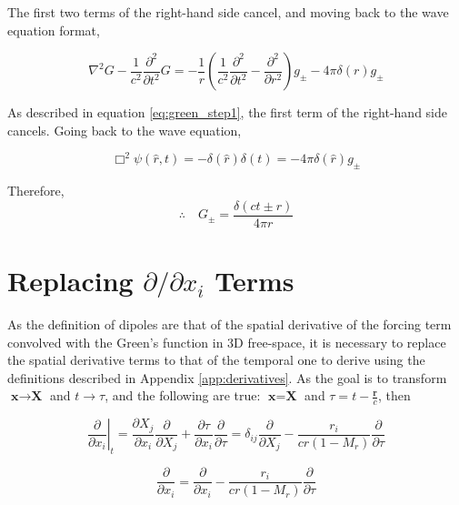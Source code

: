 The first two terms of the right-hand side cancel, and moving back to the wave equation format,

\begin{equation}
    \nabla^2G-\frac{1}{c^2}\frac{\partial^2}{\partial t^2}G = -\frac{1}{r} \left(\frac{1}{c^2}\frac{\partial^2}{\partial t^2} - \frac{\partial ^2}{\partial r^2}\right)g_{\pm} - 4\pi \delta(r)g_{\pm}
    \label{eq:green_step2}
\end{equation}

As described in equation \ref{eq:green_step1}, the first term of the right-hand side cancels. Going back to the wave equation,

\begin{equation*}
    \Box^2 \psi(\hat{r},t)=-\delta(\hat{r})\delta(t)=-4\pi \delta(\hat{r})g_{\pm}
\end{equation*}

Therefore, 
\begin{equation}
    \therefore \quad G_{\pm}=\frac{\delta(ct\pm r)}{4\pi r}
    \label{eq:greensfunction_derived}
\end{equation}

\chapter{Replacing \texorpdfstring{$\partial / \partial x_i$}/ Terms} \label{app:ddx_replace}

As the definition of dipoles are that of the spatial derivative of the forcing term convolved with the Green's function in 3D free-space, it is necessary to replace the spatial derivative terms to that of the temporal one to derive using the definitions described in Appendix \ref{app:derivatives}. As the goal is to transform $\textbf{x} \rightarrow \textbf{X}$ and $t\rightarrow\tau$, and the following are true: $\textbf{x}=\textbf{X}$ and $\tau=t-\frac{\textbf{r}}{c}$, then

\begin{equation*}
    \left. \frac{\partial}{\partial x_i} \right|_t = 
    \frac{\partial X_j}{\partial x_i} \frac{\partial}{\partial X_j} + \frac{\partial\tau}{\partial x_i} \frac{\partial}{\partial\tau}=\delta_{ij}\frac{\partial}{\partial X_j} - \frac{r_i}{cr(1-M_r)}\frac{\partial}{\partial\tau}
\end{equation*}


\begin{equation}
    \frac{\partial}{\partial x_i} = \frac{\partial}{\partial x_i} - \frac{r_i}{cr(1-M_r)}\frac{\partial}{\partial\tau}
\end{equation}

